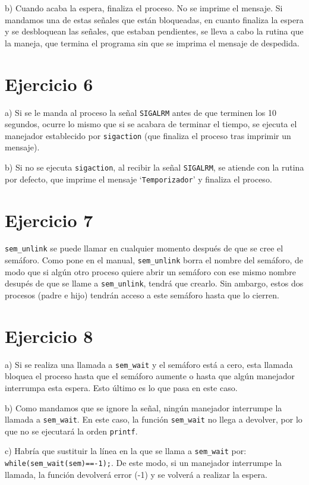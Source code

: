 \documentclass{article}
\begin{document}
b) Cuando acaba la espera, finaliza el proceso. No se imprime el mensaje. Si mandamos una de estas señales que están bloqueadas, en cuanto finaliza la espera y se desbloquean las señales, que estaban pendientes, se lleva a cabo la rutina que la maneja, que termina el programa sin que se imprima el mensaje de despedida.

\section*{Ejercicio 6}
a) Si se le manda al proceso la señal \texttt{SIGALRM} antes de que terminen los 10 segundos, ocurre lo mismo que si se acabara de terminar el tiempo, se ejecuta el manejador establecido por \texttt{sigaction} (que finaliza el proceso tras imprimir un mensaje).

b) Si no se ejecuta \texttt{sigaction}, al recibir la señal \texttt{SIGALRM}, se atiende con la rutina por defecto, que imprime el mensaje `\texttt{Temporizador}' y finaliza el proceso.

\section*{Ejercicio 7}
\texttt{sem\_unlink} se puede llamar en cualquier momento después de que se cree el semáforo. Como pone en el manual, \texttt{sem\_unlink} borra el nombre del semáforo, de modo que si algún otro proceso quiere abrir un semáforo con ese mismo nombre desupés de que se llame a \texttt{sem\_unlink}, tendrá que crearlo. Sin ambargo, estos dos procesos (padre e hijo) tendrán acceso a este semáforo hasta que lo cierren. 


\section*{Ejercicio 8}
a) Si se realiza una llamada a \texttt{sem\_wait} y el semáforo está a cero, esta llamada bloquea el proceso hasta que el semáforo aumente o hasta que algún manejador interrumpa esta espera. Esto último es lo que pasa en este caso. 

b) Como mandamos que se ignore la señal, ningún manejador interrumpe la llamada a \texttt{sem\_wait}. En este caso, la función \texttt{sem\_wait} no llega a devolver, por lo que no se ejecutará la orden \texttt{printf}.

c) Habría que sustituir la línea en la que se llama a \texttt{sem\_wait} por: \texttt{while(sem\_wait(sem)==-1);}. De este modo, si un manejador interrumpe la llamada, la función devolverá error (-1) y se volverá a realizar la espera.
\end{document}
